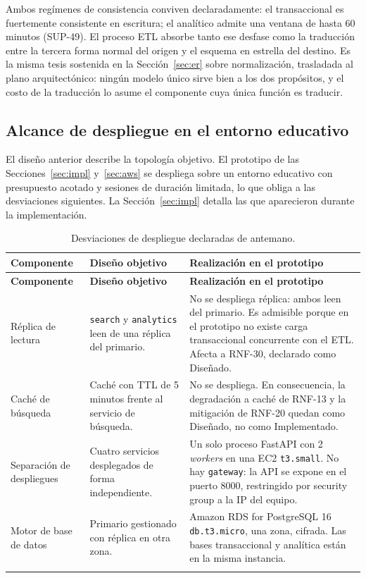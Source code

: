 \documentclass[10pt,letterpaper]{article}
\begin{document}
Ambos regímenes de consistencia conviven declaradamente: el transaccional es fuertemente consistente en escritura; el analítico admite una ventana de hasta 60 minutos (SUP-49). El proceso ETL absorbe tanto ese desfase como la traducción entre la tercera forma normal del origen y el esquema en estrella del destino. Es la misma tesis sostenida en la Sección~\ref{sec:er} sobre normalización, trasladada al plano arquitectónico: ningún modelo único sirve bien a los dos propósitos, y el costo de la traducción lo asume el componente cuya única función es traducir.

\subsection{Alcance de despliegue en el entorno educativo}
\label{sec:despliegue}
El diseño anterior describe la topología objetivo. El prototipo de las Secciones~\ref{sec:impl} y~\ref{sec:aws} se despliega sobre un entorno educativo con presupuesto acotado y sesiones de duración limitada, lo que obliga a las desviaciones siguientes. La Sección~\ref{sec:impl} detalla las que aparecieron durante la implementación.

\begin{longtable}{@{}L{3.4cm} L{4.8cm} L{6.6cm}@{}}
\toprule \textbf{Componente} & \textbf{Diseño objetivo} & \textbf{Realización en el prototipo} \\ \midrule \endfirsthead
\toprule \textbf{Componente} & \textbf{Diseño objetivo} & \textbf{Realización en el prototipo} \\ \midrule \endhead
Réplica de lectura & \texttt{search} y \texttt{analytics} leen de una réplica del primario. & No se despliega réplica: ambos leen del primario. Es admisible porque en el prototipo no existe carga transaccional concurrente con el ETL. Afecta a RNF-30, declarado como Diseñado. \\
Caché de búsqueda & Caché con TTL de 5 minutos frente al servicio de búsqueda. & No se despliega. En consecuencia, la degradación a caché de RNF-13 y la mitigación de RNF-20 quedan como Diseñado, no como Implementado. \\
Separación de despliegues & Cuatro servicios desplegados de forma independiente. & Un solo proceso FastAPI con 2 \emph{workers} en una EC2 \texttt{t3.small}. No hay \texttt{gateway}: la API se expone en el puerto 8000, restringido por security group a la IP del equipo. \\
Motor de base de datos & Primario gestionado con réplica en otra zona. & Amazon RDS for PostgreSQL 16 \texttt{db.t3.micro}, una zona, cifrada. Las bases transaccional y analítica están en la misma instancia. \\
\bottomrule
\caption{Desviaciones de despliegue declaradas de antemano.}
\end{longtable}
\end{document}
